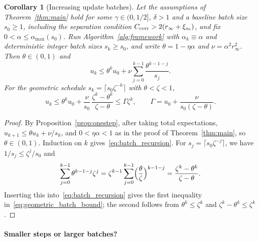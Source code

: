 \documentclass[pdflatex,sn-mathphys-num]{sn-jnl}
\theoremstyle{thmstyleone}
\newtheorem{corollary}{Corollary}
\theoremstyle{thmstylethree}
\begin{document}
\begin{corollary}[Increasing update batches]
\label{cor:increasing_batch}
Let the assumptions of Theorem~\ref{thm:main} hold for some
$\gamma\in(0,1/2]$, $\delta>1$ and a baseline batch size $s_0\ge1$,
including the separation condition $C_{\rm corr}>2(r_\infty+\xi_{s_0})$, and
fix $0<\alpha\le\alpha_{\max}(s_0)$. Run Algorithm~\ref{alg:framework} with
$\alpha_k\equiv\alpha$ and deterministic integer batch sizes $s_k\ge s_0$, and
write $\theta=1-\eta\alpha$ and $\nu=\alpha^2r_\infty^2.$
Then $\theta\in(0,1)$ and
\begin{equation}
\label{eq:batch_recursion}
u_k\le\theta^ku_0+\nu\sum_{j=0}^{k-1}\frac{\theta^{k-1-j}}{s_j}.
\end{equation}
For the geometric schedule
$s_k=\lceil s_0\zeta^{-k}\rceil$ with $\theta<\zeta<1$,
\begin{equation}
\label{eq:geometric_batch_bound}
u_k\le\theta^ku_0+\frac{\nu}{s_0}\,\frac{\zeta^k-\theta^k}{\zeta-\theta}
\le\Gamma\zeta^k,
\qquad
\Gamma=u_0+\frac{\nu}{s_0(\zeta-\theta)}.
\end{equation}
\end{corollary}

\begin{proof} By Proposition~\ref{prop:onestep}, after taking total expectations,
$u_{k+1}\le\theta u_k+\nu/s_k$, and $0<\eta\alpha<1$ as in the proof of
Theorem~\ref{thm:main}, so $\theta\in(0,1)$. Induction on $k$
gives~\eqref{eq:batch_recursion}. For $s_j=\lceil s_0\zeta^{-j}\rceil$, we
have $1/s_j\le\zeta^j/s_0$ and
\[
\sum_{j=0}^{k-1}\theta^{k-1-j}\zeta^j
=\zeta^{k-1}\sum_{j=0}^{k-1}\Bigl(\frac{\theta}{\zeta}\Bigr)^{k-1-j}
=\frac{\zeta^k-\theta^k}{\zeta-\theta}.
\]
Inserting this into~\eqref{eq:batch_recursion} gives the first inequality
in~\eqref{eq:geometric_batch_bound}; the second follows from
$\theta^k\le\zeta^k$ and $\zeta^k-\theta^k\le\zeta^k$.
\end{proof}

\paragraph{Smaller steps or larger batches?}
\label{subsec:cost}
\end{document}
